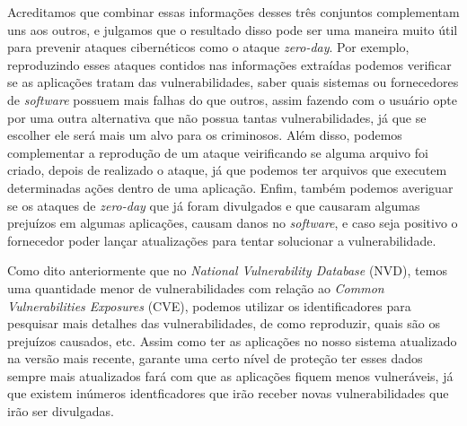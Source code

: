 Acreditamos que combinar essas informações desses três conjuntos complementam uns aos outros, e julgamos que 
o resultado disso pode ser uma maneira muito útil para prevenir ataques cibernéticos como o ataque 
\textit{zero-day}. Por exemplo, reproduzindo esses ataques contidos nas informações extraídas 
podemos verificar se as aplicações tratam das vulnerabilidades, saber quais sistemas ou fornecedores 
de \textit{software} possuem mais falhas do que outros, assim fazendo com o usuário opte por uma outra alternativa que 
não possua tantas vulnerabilidades, já que se escolher ele será mais um alvo para os criminosos. Além disso, podemos complementar a 
reprodução de um ataque veirificando se alguma arquivo foi criado, depois de realizado o ataque, já que podemos ter arquivos que 
executem determinadas ações dentro de uma aplicação. Enfim, também podemos averiguar se os ataques de \textit{zero-day} que já foram 
divulgados e que causaram algumas prejuízos em algumas aplicações, causam danos no \textit{software}, e caso seja positivo o fornecedor 
poder lançar atualizações para tentar solucionar a vulnerabilidade.

Como dito anteriormente que no \textit{National Vulnerability Database} (NVD), temos uma quantidade menor de 
vulnerabilidades com relação ao \textit{Common Vulnerabilities Exposures} (CVE), podemos utilizar os 
identificadores para pesquisar mais detalhes das vulnerabilidades, de como reproduzir, quais são os prejuízos 
causados, etc. Assim como ter as aplicações no nosso sistema atualizado na versão mais recente, garante uma certo nível de proteção ter 
esses dados sempre mais atualizados fará com que as aplicações fiquem menos vulneráveis, já que existem inúmeros identficadores que 
irão receber novas vulnerabilidades que irão ser divulgadas.